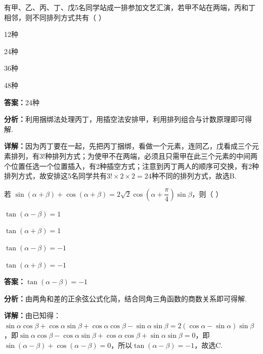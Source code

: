 \begin{question}[points=5]
有甲、乙、丙、丁、戊5名同学站成一排参加文艺汇演，若甲不站在两端，丙和丁相邻，则不同排列方式共有（ ）
\begin{choices}
  \item 12种
  \item 24种
  \item 36种
  \item 48种
\end{choices}
\begin{solution}
\textbf{答案：}24种

\textbf{分析：}利用捆绑法处理丙丁，用插空法安排甲，利用排列组合与计数原理即可得解.

\textbf{详解：}因为丙丁要在一起，先把丙丁捆绑，看做一个元素，连同乙，戊看成三个元素排列，有$3!$种排列方式；为使甲不在两端，必须且只需甲在此三个元素的中间两个位置任选一个位置插入，有2种插空方式；注意到丙丁两人的顺序可交换，有2种排列方式，故安排这5名同学共有$3!\times 2\times 2=24$种不同的排列方式，故选B.
\end{solution}
\end{question}

\begin{question}[points=5]
若 $\sin(\alpha+\beta)+\cos(\alpha+\beta)=2\sqrt{2}\cos\left(\alpha+\dfrac{\pi}{4}\right)\sin\beta$，则（ ）
\begin{choices}
  \item $\tan(\alpha-\beta)=1$
  \item $\tan(\alpha+\beta)=1$
  \item $\tan(\alpha-\beta)=-1$
  \item $\tan(\alpha+\beta)=-1$
\end{choices}
\begin{solution}
\textbf{答案：}$\tan(\alpha-\beta)=-1$

\textbf{分析：}由两角和差的正余弦公式化简，结合同角三角函数的商数关系即可得解.

\textbf{详解：}由已知得：$\sin\alpha\cos\beta+\cos\alpha\sin\beta+\cos\alpha\cos\beta-\sin\alpha\sin\beta=2(\cos\alpha-\sin\alpha)\sin\beta$，即$\sin\alpha\cos\beta-\cos\alpha\sin\beta+\cos\alpha\cos\beta+\sin\alpha\sin\beta=0$，即$\sin(\alpha-\beta)+\cos(\alpha-\beta)=0$，所以$\tan(\alpha-\beta)=-1$，故选C.
\end{solution}
\end{question}

